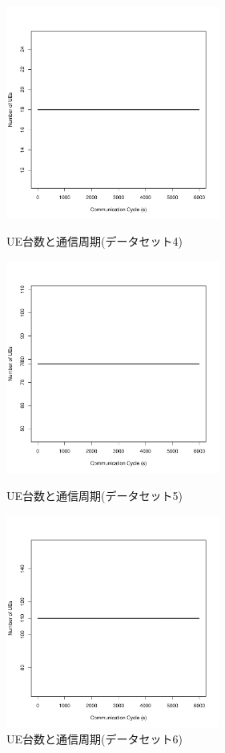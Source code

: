 \documentclass[a4j]{ujarticle}
\begin{document}
\begin{figure}[htbp]
 \begin{minipage}{0.5\hsize}
  \begin{center}
   \includegraphics[width=70mm]{UE_cycle_dataset4.pdf}
  \end{center}
  \caption{UE台数と通信周期(データセット4)}
  \label{UE_cycle_dataset4}
 \end{minipage}
 \begin{minipage}{0.5\hsize}
 \begin{center}
  \includegraphics[width=70mm]{UE_cycle_dataset5.pdf}
 \end{center}
  \caption{UE台数と通信周期(データセット5)}
  \label{UE_cycle_dataset5}
 \end{minipage}
 \begin{minipage}{0.5\hsize}
 \begin{center}
  \includegraphics[width=70mm]{UE_cycle_dataset6.pdf}
 \end{center}
  \caption{UE台数と通信周期(データセット6)}
  \label{UE_cycle_dataset6}
 \end{minipage}
\end{figure}
\end{document}
